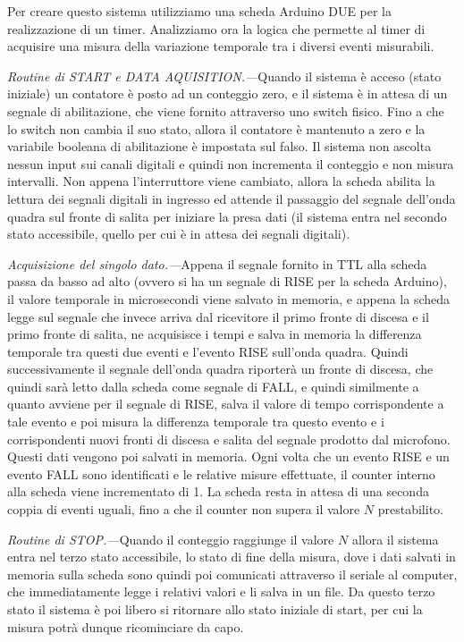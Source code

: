 \documentclass[
    rmp,
    reprint, 
    superscriptaddress, 
    altaffilletter, 
    amsmath, 
    amssymb, 
    a4paper,
    varvw]{revtex4-2}
\begin{document}
Per creare questo sistema utilizziamo una scheda Arduino DUE per la realizzazione di un timer.  Analizziamo ora la logica che permette al timer di acquisire una misura della variazione temporale tra i diversi eventi misurabili. 

\textit{Routine di \emph{START} e \emph{DATA AQUISITION}.---}Quando il sistema è acceso (stato iniziale) un contatore è posto ad un conteggio zero, e il sistema è in attesa di un segnale di abilitazione, che viene fornito attraverso uno switch fisico. Fino a che lo switch non cambia il suo stato, allora il contatore è mantenuto a zero e la variabile booleana di abilitazione è impostata sul falso. Il sistema non ascolta nessun input sui canali digitali e quindi non incrementa il conteggio e non misura intervalli. Non appena l'interruttore viene cambiato, allora la scheda abilita la lettura dei segnali digitali in ingresso ed attende il passaggio del segnale dell'onda quadra sul fronte di salita per iniziare la presa dati (il sistema entra nel secondo stato accessibile, quello per cui è in attesa dei segnali digitali).

\textit{Acquisizione del singolo dato.---}Appena il segnale fornito in TTL alla scheda passa da basso ad alto (ovvero si ha un segnale di RISE per la scheda Arduino), il valore temporale in microsecondi viene salvato in memoria, e appena la scheda legge sul segnale che invece arriva dal ricevitore il primo fronte di discesa e il primo fronte di salita, ne acquisisce i tempi e salva in memoria la differenza temporale tra questi due eventi e l'evento RISE sull'onda quadra. Quindi successivamente il segnale dell'onda quadra riporterà un fronte di discesa, che quindi sarà letto dalla scheda come segnale di FALL, e quindi similmente a quanto avviene per il segnale di RISE, salva il valore di tempo corrispondente a tale evento e poi misura la differenza temporale tra questo evento e i corrispondenti nuovi fronti di discesa e salita del segnale prodotto dal microfono. Questi dati vengono poi salvati in memoria. Ogni volta che un evento RISE e un evento FALL sono identificati e le relative misure effettuate, il counter interno alla scheda viene incrementato di 1. La scheda resta in attesa di una seconda coppia di eventi uguali, fino a che il counter non supera il valore $N$ prestabilito. 

\textit{Routine di \emph{STOP}.---}Quando il conteggio raggiunge il valore $N$ allora il sistema entra nel terzo stato accessibile, lo stato di fine della misura, dove i dati salvati in memoria sulla scheda sono quindi poi comunicati attraverso il seriale al computer, che immediatamente legge i relativi valori e li salva in un file. Da questo terzo stato il sistema è poi libero si ritornare allo stato iniziale di start, per cui la misura potrà dunque ricominciare da capo. 
\end{document}
